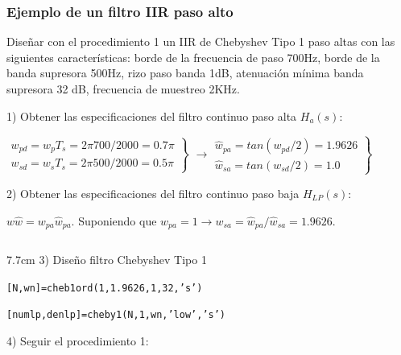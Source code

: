\begin{frame}
\frametitle{Ejemplo de un filtro  IIR  paso alto}
\footnotesize

\footnotesize
\color{olivegreen} Diseñar con el procedimiento 1 un IIR de Chebyshev Tipo 1 paso altas con las siguientes características: borde de la frecuencia de paso 700Hz, borde de la banda supresora 500Hz, rizo paso banda 1dB, atenuación mínima banda supresora 32 dB, frecuencia de muestreo 2KHz.
\color{gray}
\vspace{0.1cm}

1)  Obtener las especificaciones del filtro continuo paso alta $H_a(s)$:

$\left . \begin{array}{l}w_{pd}=w_pT_s=2\pi 700/2000=0.7\pi\\w_{sd}=w_sT_s=2\pi 500/2000=0.5\pi\end{array}\right \}$ $\rightarrow \left . \begin{array}{l}\hat w_{pa}=tan(w_{pd}/2)=1.9626\\\hat w_{sa}=tan(w_{sd}/2)=1.0\end{array}\right \}$

\vspace{0.1cm}

2) Obtener las especificaciones del filtro continuo paso baja $H_{LP}(s)$:

\vspace{0.1cm}


\hspace{0.25cm}$w\hat w=w_{pa}\hat w_{pa}$. Suponiendo que $w_{pa}=1 \rightarrow w_{sa}=\hat w_{pa}/\hat w_{sa}=1.9626$.

\vspace{0.1cm}

\begin{columns}[T]
 \hspace{0.2cm}\begin{column}{7.7cm}
3) Diseño filtro Chebyshev Tipo 1

\vspace{0.1cm}

\hspace{0.25cm}\texttt{[N,wn]=cheb1ord(1,1.9626,1,32,'s')}

\hspace{0.25cm}\texttt{[numlp,denlp]=cheby1(N,1,wn,'low','s')}

\vspace{0.1cm}

 4) Seguir el procedimiento 1:


\end{column}
\end{columns}
\end{frame}
